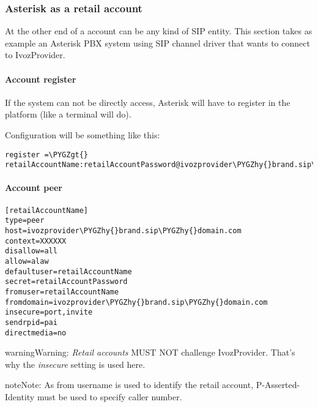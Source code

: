 \documentclass[letterpaper,10pt,english]{sphinxmanual}
\def\PYGZgt{\char`\>}
\def\PYGZhy{\char`\-}
\begin{document}
\subsubsection{Asterisk as a retail account}
\label{administration_portal/client/retail/retail_accounts:asterisk-as-a-retail-account}
At the other end of a account can be any kind of SIP entity. This section takes
as example an Asterisk PBX system using SIP channel driver that wants to connect
to IvozProvider.


\paragraph{Account register}
\label{administration_portal/client/retail/retail_accounts:account-register}
If the system can not be directly access, Asterisk will have to register in the
platform (like a terminal will do).

Configuration will be something like this:

\begin{Verbatim}[commandchars=\\\{\}]
register =\PYGZgt{} retailAccountName:retailAccountPassword@ivozprovider\PYGZhy{}brand.sip\PYGZhy{}domain.com
\end{Verbatim}


\paragraph{Account peer}
\label{administration_portal/client/retail/retail_accounts:account-peer}
\begin{Verbatim}[commandchars=\\\{\}]
[retailAccountName]
type=peer
host=ivozprovider\PYGZhy{}brand.sip\PYGZhy{}domain.com
context=XXXXXX
disallow=all
allow=alaw
defaultuser=retailAccountName
secret=retailAccountPassword
fromuser=retailAccountName
fromdomain=ivozprovider\PYGZhy{}brand.sip\PYGZhy{}domain.com
insecure=port,invite
sendrpid=pai
directmedia=no
\end{Verbatim}

\begin{notice}{warning}{Warning:}
\emph{Retail accounts} MUST NOT challenge IvozProvider. That's
why the \emph{insecure} setting is used here.
\end{notice}

\begin{notice}{note}{Note:}
As from username is used to identify the retail account, P-Asserted-Identity must be used to specify caller number.
\end{notice}
\end{document}
